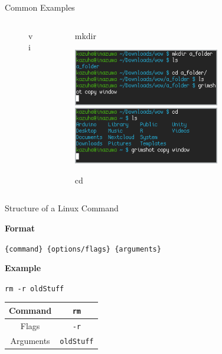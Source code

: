 \documentclass{beamer}
\begin{document}
\begin{frame}{Common Examples}
\begin{columns}
\begin{column}{0.33\textwidth}
\begin{figure}
				\caption{vi}
			\end{figure}
		\end{column}
		\begin{column}{0.33\textwidth}
			\begin{figure}
				\centering
				\caption{mkdir}
				\includegraphics[width=0.7\textwidth]{mkdir.png}
				\includegraphics[width=0.7\textwidth]{cd.png}
				\caption{cd}
			\end{figure}
		\end{column}
	\end{columns}
\end{frame}

\begin{frame}{Structure of a Linux Command}
	\begin{Large}
		\textbf{Format} \\
	\end{Large}
	\texttt{\{command\} \{options/flags\} \{arguments\}}

	\vspace{0.3cm}

	\begin{Large}
		\textbf{Example} \\
	\end{Large}
	\texttt{rm -r oldStuff}

	\vspace{0.3cm}

	\begin{tabular}{|c|c|}
		\hline
		Command & \texttt{rm} \\
		\hline
		Flags & \texttt{-r} \\
		\hline
		Arguments & \texttt{oldStuff} \\
		\hline
	\end{tabular}
\end{frame}
\end{document}
